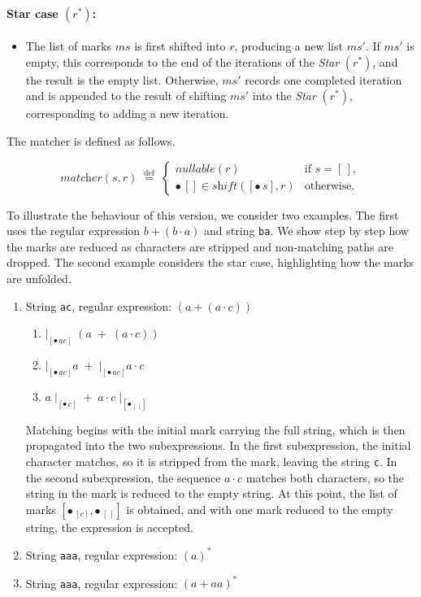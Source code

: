 \documentclass[12pt]{article}
\newcommand{\shift}{\textit{shift}}
\newcommand{\Marked}[1]{\bullet\,#1}
\newcommand{\nullable}{\textit{nullable}}
\newcommand{\STARText}{\textit{Star} $(r^*)$}
\newcommand{\emptylist}{[\,]}
\newcommand{\matcher}{\textit{matcher}}
\begin{document}
\paragraph*{\textbf{Star case} $(r^*)$:}
\begin{itemize}
  \item The list of marks $ms$ is first shifted into $r$, producing a new list $ms'$.  
        If $ms'$ is empty, this corresponds to the end of the iterations of the \STARText, 
        and the result is the empty list.  
        Otherwise, $ms'$ records one completed iteration and is appended to the result of shifting $ms'$ into the \STARText, 
        corresponding to adding a new iteration.
\end{itemize}

The matcher is defined as follows.

\[
\matcher(s, r) \; \stackrel{\text{def}}{=}\;
  \begin{cases}
    \nullable(r) & \text{if $s = \emptylist$}, \\
    \Marked{[]} \in \shift([\Marked{s}], r) & \text{otherwise.}
  \end{cases}
\]

To illustrate the behaviour of this version, we consider two examples.  
The first uses the regular expression $b + (b \cdot a)$  
and string \texttt{ba}.  
We show step by step how the marks are reduced  
as characters are stripped and non-matching paths are dropped.  
The second example considers the star case,  
highlighting how the marks are unfolded.  




\begin{enumerate}
  \item String \texttt{ac}, regular expression: $(a + (a \cdot c))$
  \begin{enumerate}
    \item $\bigl|_{[\Marked{ac}]} \;\left( a \;+\; (a \cdot c) \right)$

    \item $ \bigl|_{[\Marked{ac}]} a  \;+\;
            \bigl|_{[\Marked{ac}]} a \cdot c $

    \item $ a \;\bigl|_{[\Marked{c}]} 
           \;+\;
            a \cdot c \;\bigl|_{[\Marked{_{\emptylist}}]} $
  \end{enumerate}
Matching begins with the initial mark carrying the full string,  
which is then propagated into the two subexpressions.  
In the first subexpression, the initial character matches,  
so it is stripped from the mark, leaving the string \texttt{c}.  
In the second subexpression, the sequence $a \cdot c$ matches both characters,  
so the string in the mark is reduced to the empty string.  
At this point, the list of marks 
$[\Marked{_{[c]}}, \Marked{_{\emptylist}}]$ is obtained,  
and with one mark reduced to the empty string,  
the expression is accepted.  
  

\item String \texttt{aaa}, regular expression: $(a)^*$
\item String \texttt{aaa}, regular expression: $(a+aa)^*$
\end{enumerate}
\end{document}
